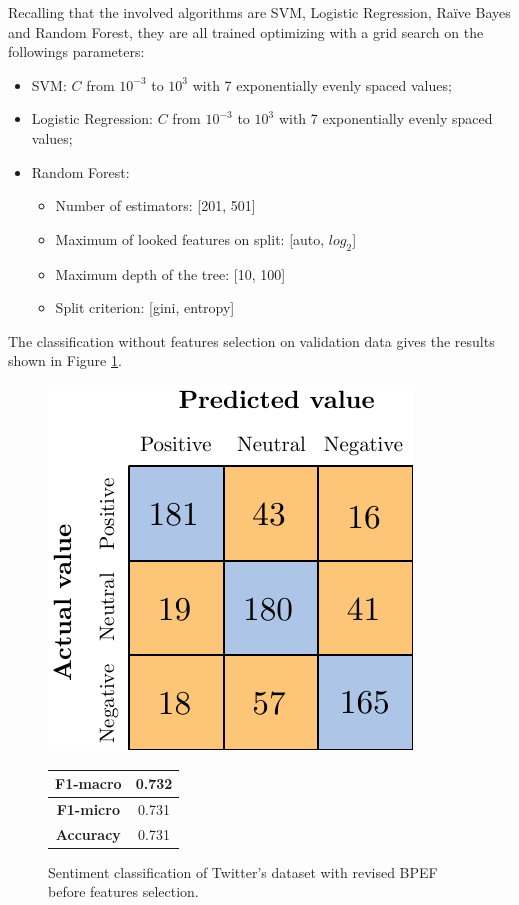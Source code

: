 Recalling that the involved algorithms are SVM, Logistic Regression, Ra{\"i}ve Bayes and Random Forest, they are all trained optimizing with a grid search on the followings parameters:
\begin{itemize}
	\item SVM: $C$ from $10^{-3}$ to $10^3$ with 7 exponentially evenly spaced values;
	\item Logistic Regression: $C$ from $10^{-3}$ to $10^3$ with 7 exponentially evenly spaced values;
	\item Random Forest: 
	\begin{itemize}
		\item Number of estimators: [201, 501]
		\item Maximum of looked features on split: [auto, $log_2$]
		\item Maximum depth of the tree: [10, 100]
		\item Split criterion: [gini, entropy]
	\end{itemize}
\end{itemize}

The classification without features selection on validation data gives the results shown in Figure \ref{fig:tw_snt_bpef_bfs}.

\begin{figure}[H]
\begin{minipage}[b]{0.6\linewidth}
	\centering
	\includegraphics[scale=1]{figures/conf_matrices/twitter_snt_bpef/twitter_snt_bpef_bfs.pdf}
\end{minipage}
\begin{minipage}[b]{0.3\linewidth}
	\begin{tabular}[b]{ | c | c | } 
		\hline
		\textbf{F1-macro} & 0.732 \\
		\hline
		\textbf{F1-micro} & 0.731 \\ 
		\hline
		\textbf{Accuracy} & 0.731 \\ 
		\hline
	\end{tabular}
\end{minipage}
	\caption{Sentiment classification of Twitter's dataset with revised BPEF before features selection.}
	\label{fig:tw_snt_bpef_bfs}
\end{figure}


